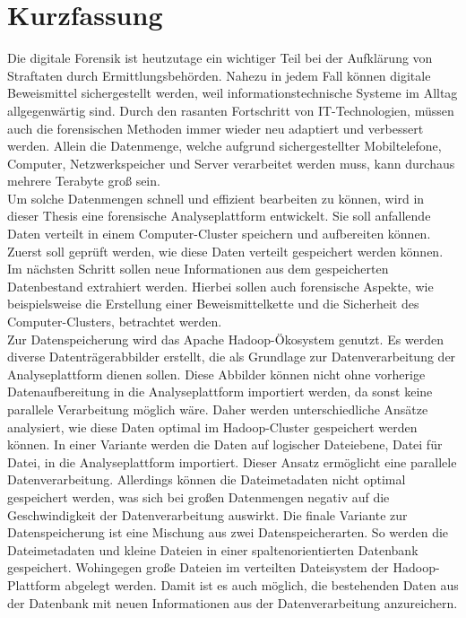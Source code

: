 %
\section*{Kurzfassung}
Die digitale Forensik ist heutzutage ein wichtiger Teil bei der Aufklärung von Straftaten durch Ermittlungsbehörden. Nahezu in jedem Fall können digitale Beweismittel sichergestellt werden, weil informationstechnische Systeme im Alltag allgegenwärtig sind. Durch den rasanten Fortschritt von IT-Technologien, müssen auch die forensischen Methoden immer wieder neu adaptiert und verbessert werden. Allein die Datenmenge, welche aufgrund sichergestellter Mobiltelefone, Computer, Netzwerkspeicher und Server verarbeitet werden muss, kann durchaus mehrere Terabyte groß sein.\\
Um solche Datenmengen schnell und effizient bearbeiten zu können, wird in dieser Thesis eine forensische Analyseplattform entwickelt. Sie soll anfallende Daten verteilt in einem Computer-Cluster speichern und aufbereiten können. Zuerst soll geprüft werden, wie diese Daten verteilt gespeichert werden können. Im nächsten Schritt sollen neue Informationen aus dem gespeicherten Datenbestand extrahiert werden. Hierbei sollen auch forensische Aspekte, wie beispielsweise die Erstellung einer Beweismittelkette und die Sicherheit des Computer-Clusters, betrachtet werden.\\

\noindent
Zur Datenspeicherung wird das Apache Hadoop\textsuperscript{\textregistered}-Ökosystem genutzt. Es werden diverse Datenträgerabbilder erstellt, die als Grundlage zur Datenverarbeitung der Analyseplattform dienen sollen. Diese Abbilder können nicht ohne vorherige Datenaufbereitung in die Analyseplattform importiert werden, da sonst keine parallele Verarbeitung möglich wäre. Daher werden unterschiedliche Ansätze analysiert, wie diese Daten optimal im Hadoop-Cluster gespeichert werden können. In einer Variante werden die Daten auf logischer Dateiebene, Datei für Datei, in die Analyseplattform importiert. Dieser Ansatz ermöglicht eine parallele Datenverarbeitung. Allerdings können die Dateimetadaten nicht optimal gespeichert werden, was sich bei großen Datenmengen negativ auf die Geschwindigkeit der Datenverarbeitung auswirkt.
Die finale Variante zur Datenspeicherung ist eine Mischung aus zwei Datenspeicherarten. So werden die Dateimetadaten und kleine Dateien in einer spaltenorientierten Datenbank gespeichert. Wohingegen große Dateien im verteilten Dateisystem der Hadoop-Plattform abgelegt werden. Damit ist es auch möglich, die bestehenden Daten aus der Datenbank mit neuen Informationen aus der Datenverarbeitung anzureichern.\\

